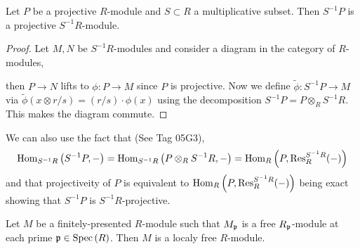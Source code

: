 \documentclass[12pt]{article}
\begin{document}
\begin{lemma}
Let $P$ be a projective $R$-module and $S \subset R$ a multiplicative subset. Then $S^{-1} P$ is a projective $S^{-1} R$-module.
\end{lemma}

\begin{proof}
Let $M, N$ be $S^{-1} R$-modules and consider a diagram in the category of $R$-modules,
\begin{center}
\end{center}
then $P \to N$ lifts to $\phi : P \to M$ since $P$ is projective. Now we define $\tilde{\phi} : S^{-1} P \to M$ via $\tilde{\phi}(x \otimes r/s) = (r/s) \cdot \phi(x)$ using the decomposition $S^{-1} P = P \otimes_R S^{-1} R$. This makes the diagram commute. 
\end{proof}

\begin{remark}
We can also use the fact that (See Tag 05G3),
\[ \mathrm{Hom}_{S^{-1} R} \left( S^{-1} P, - \right) = \mathrm{Hom}_{S^{-1} R} \left( P \otimes_R S^{-1} R, - \right) = \mathrm{Hom}_{R} \left( P, \mathrm{Res}^{S^{-1} R}_{R} (-) \right) \]
and that projectiveity of $P$ is equivalent to $\mathrm{Hom}_{R} \left( P, \mathrm{Res}^{S^{-1} R}_{R} (-) \right)$ being exact showing that $S^{-1} P$ is $S^{-1} R$-projective.
\end{remark}

\begin{lemma}
Let $M$ be a finitely-presented $R$-module such that $M_{\mathfrak{p}}$ is a free $R_{\mathfrak{p}}$-module at each prime $\mathfrak{p} \in \mathrm{Spec}\left( R \right)$. Then $M$ is a localy free $R$-module.
\end{lemma}
\end{document}

